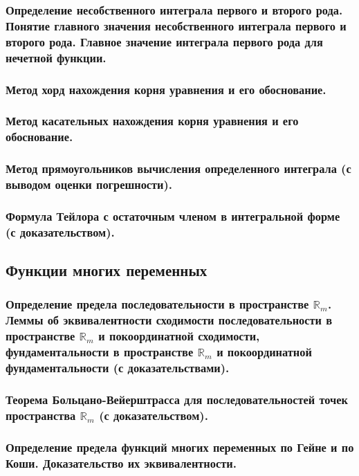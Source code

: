 \documentclass[10pt]{article}
\begin{document}
    \subsubsection{Определение несобственного интеграла первого и второго рода. Понятие главного значения несобственного интеграла первого и второго рода. Главное значение интеграла первого рода для нечетной функции.}
    \subsubsection{Метод хорд нахождения корня уравнения и его обоснование.}
    \subsubsection{Метод касательных нахождения корня уравнения и его обоснование.}
    \subsubsection{Метод прямоугольников вычисления определенного интеграла (с выводом оценки погрешности).}
    \subsubsection{Формула Тейлора с остаточным членом в интегральной форме (с доказательством).}
    \subsection{Функции многих переменных}
    \subsubsection{Определение предела последовательности в пространстве $\mathbb{R}_m$. Леммы об эквивалентности сходимости последовательности в пространстве $\mathbb{R}_m$ и покоординатной сходимости, фундаментальности в пространстве $\mathbb{R}_m$ и покоординатной фундаментальности (с доказательствами).}
    \subsubsection{Теорема Больцано-Вейерштрасса для последовательностей точек пространства $\mathbb{R}_m$ (с доказательством).}
    \subsubsection{Определение предела функций многих переменных по Гейне и по Коши. Доказательство их эквивалентности.}
\end{document}
